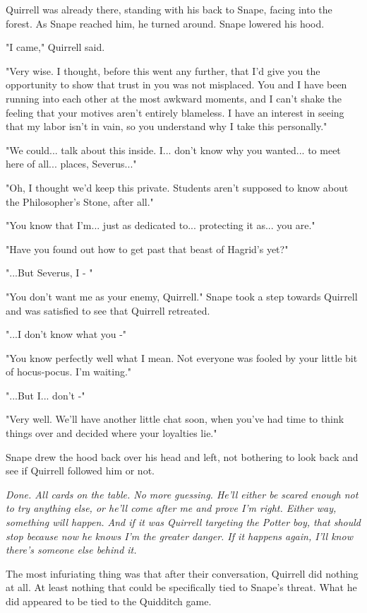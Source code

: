 \documentclass[a4paper,11pt]{article}
\begin{document}
Quirrell was already there, standing with his back to Snape, facing into the forest. As Snape reached him, he turned around. Snape lowered his hood.

"I came," Quirrell said.

"Very wise. I thought, before this went any further, that I'd give you the opportunity to show that trust in you was not misplaced. You and I have been running into each other at the most awkward moments, and I can't shake the feeling that your motives aren't entirely blameless. I have an interest in seeing that my labor isn't in vain, so you understand why I take this personally."

"We could... talk about this inside. I... don't know why you wanted... to meet here of all... places, Severus..."

"Oh, I thought we'd keep this private. Students aren't supposed to know about the Philosopher's Stone, after all."

"You know that I'm... just as dedicated to... protecting it as... you are."

"Have you found out how to get past that beast of Hagrid's yet?"

"...But Severus, I - "

"You don't want me as your enemy, Quirrell." Snape took a step towards Quirrell and was satisfied to see that Quirrell retreated.

"...I don't know what you -"

"You know perfectly well what I mean. Not everyone was fooled by your little bit of hocus-pocus. I'm waiting."

"...But I... don't -"

"Very well. We'll have another little chat soon, when you've had time to think things over and decided where your loyalties lie."

Snape drew the hood back over his head and left, not bothering to look back and see if Quirrell followed him or not.

\emph{Done. All cards on the table. No more guessing. He'll either be scared enough not to try anything else, or he'll come after me and prove I'm right. Either way, something will happen. And if it was Quirrell targeting the Potter boy, that should stop because now he knows I'm the greater danger. If it happens again, I'll know there's someone else behind it.}

The most infuriating thing was that after their conversation, Quirrell did nothing at all. At least nothing that could be specifically tied to Snape's threat. What he did appeared to be tied to the Quidditch game.
\end{document}
